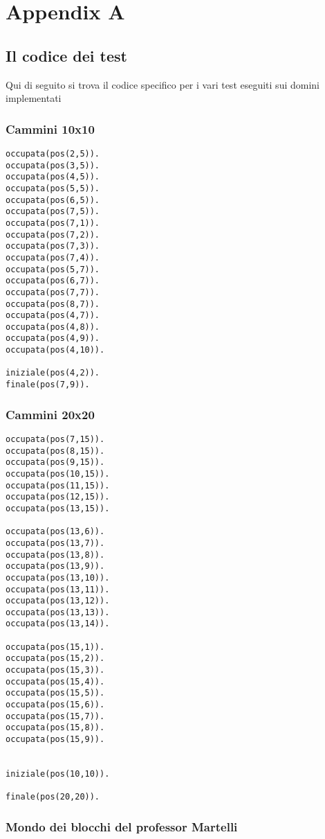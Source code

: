 \newpage

\appendix
\chapter{Appendix A}

\section{Il codice dei test}
Qui di seguito si trova il codice specifico per i vari test eseguiti sui domini implementati

\subsection{Cammini 10x10}

\begin{lstlisting}
occupata(pos(2,5)).
occupata(pos(3,5)).
occupata(pos(4,5)).
occupata(pos(5,5)).
occupata(pos(6,5)).
occupata(pos(7,5)).
occupata(pos(7,1)).
occupata(pos(7,2)).
occupata(pos(7,3)).
occupata(pos(7,4)).
occupata(pos(5,7)).
occupata(pos(6,7)).
occupata(pos(7,7)).
occupata(pos(8,7)).
occupata(pos(4,7)).
occupata(pos(4,8)).
occupata(pos(4,9)).
occupata(pos(4,10)).

iniziale(pos(4,2)).
finale(pos(7,9)).
\end{lstlisting}

\subsection{Cammini 20x20}

\begin{lstlisting}
occupata(pos(7,15)).
occupata(pos(8,15)).
occupata(pos(9,15)).
occupata(pos(10,15)).
occupata(pos(11,15)).
occupata(pos(12,15)).
occupata(pos(13,15)).

occupata(pos(13,6)).
occupata(pos(13,7)).
occupata(pos(13,8)).
occupata(pos(13,9)).
occupata(pos(13,10)).
occupata(pos(13,11)).
occupata(pos(13,12)).
occupata(pos(13,13)).
occupata(pos(13,14)).

occupata(pos(15,1)).
occupata(pos(15,2)).
occupata(pos(15,3)).
occupata(pos(15,4)).
occupata(pos(15,5)).
occupata(pos(15,6)).
occupata(pos(15,7)).
occupata(pos(15,8)).
occupata(pos(15,9)).


iniziale(pos(10,10)).

finale(pos(20,20)).
\end{lstlisting}

\subsection{Mondo dei blocchi del professor Martelli}

